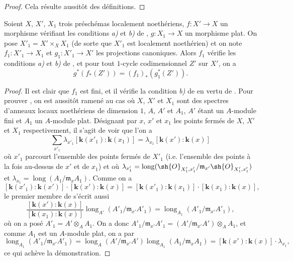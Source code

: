 \begin{proof}
Cela résulte aussitôt des définitions.
\end{proof}

\begin{proposition}[21.10.16]
\label{IV.21.10.16}
Soient $X$, $X'$, $X_1$ trois préschémas localement noethériens, $f:X'\to X$ un morphisme vérifiant les conditions \emph{a)} et \emph{b)} de , $g:X_1\to X$ un morphisme plat.
On pose $X'_1=X'\times_XX_1$ (de sorte que $X'_1$ est localement noethérien) et on note $f_1:X'_1\to X_1$ et $g_1:X'_1\to X'$ les projections canoniques.
Alors $f_1$ vérifie les conditions \emph{a)} et \emph{b)} de , et pour tout $1$-cycle codimensionnel $Z'$ sur $X'$, on a
\[
\label{IV.21.10.16.1}
  g^*(f_*(Z'))=(f_1)_*(g_1^*(Z')).
  \tag{21.10.16.1}
\]
\end{proposition}

\begin{proof}
Il est clair que $f_1$ est fini, et il vérifie la condition \emph{b)} de  en vertu de .
Pour prouver , on est aussitôt ramené au cas où $X$, $X'$ et $X_1$ sont des spectres d'anneaux locaux noethériens de dimension $1$, $A$, $A'$ et $A_1$, $A'$ étant un $A$-module fini et $A_1$ un $A$-module plat.
Désignant par $x$, $x'$ et $x_1$ les points fermés de $X$, $X'$ et $X_1$ respectivement, il s'agit de voir que l'on a
\[
\label{IV.21.10.16.2}
  \sum_{x'_1}\lambda_{x'_1}[\boldsymbol{k}(x'_1):\boldsymbol{k}(x_1)]
  =\lambda_{x_1}[\boldsymbol{k}(x'):\boldsymbol{k}(x)]
  \tag{21.10.16.2}
\]
où $x'_1$ parcourt l'ensemble des points fermés de $X'_1$ (i.e. l'ensemble des points à la fois au-dessus de $x'$ et de $x_1$) et où $\lambda_{x'_1}=\operatorname{long}(\sh{O}_{X'_1,x'_1}/\mathfrak{m}_{x'}\sh{O}_{X'_1,x'_1})$ et $\lambda_{x_1}=\operatorname{long}(A_1/\mathfrak{m}_xA_1)$.
Comme on a
\[
  [\boldsymbol{k}(x'_1):\boldsymbol{k}(x')]\cdot[\boldsymbol{k}(x'):\boldsymbol{k}(x)]
  =[\boldsymbol{k}(x'_1):\boldsymbol{k}(x_1)]\cdot[\boldsymbol{k}(x_1):\boldsymbol{k}(x)],
\]
le premier membre de  s'écrit aussi
\[
  \frac{[\boldsymbol{k}(x'): \boldsymbol{k}(x)]}{[\boldsymbol{k}(x_1): \boldsymbol{k}(x)]}
  \operatorname{long}_{A'}(A'_1/\mathfrak{m}_{x'}A'_1)
  =\operatorname{long}_{A_1}(A'_1/\mathfrak{m}_{x'}A'_1),
\]
où on a posé $A'_1=A'\otimes_AA_1$.
On a donc $A'_1/\mathfrak{m}_{x'}A'_1=(A'/\mathfrak{m}_{x'}A')\otimes_AA_1$, et comme $A_1$ est un $A$-module plat, on a par 
\[
  \operatorname{long}_{A_1}(A'_1/\mathfrak{m}_{x'}A'_1)
  =\operatorname{long}_{A}(A'/\mathfrak{m}_{x'}A')\operatorname{long}_{A_1}(A_1/\mathfrak{m}_xA_1)
  =[\boldsymbol{k}(x'): \boldsymbol{k}(x)]\cdot\lambda_{x_1},
\]
ce qui achève la démonstration.
\end{proof}

